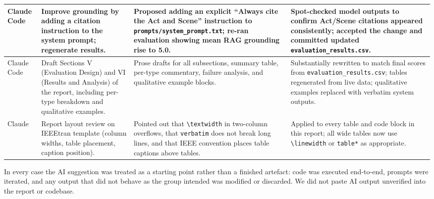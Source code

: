 \documentclass[10pt,conference]{IEEEtran}
\begin{document}
\begin{table}[!htbp]
\begin{tabularx}{\textwidth}{p{1.6cm} p{2.6cm} p{3.0cm} X}
\midrule
Claude Code
& Improve grounding by adding a citation instruction to the system prompt; regenerate results.
& Proposed adding an explicit ``Always cite the Act and Scene'' instruction to \verb|prompts/system_prompt.txt|; re-ran evaluation showing mean RAG grounding rise to 5.0.
& Spot-checked model outputs to confirm Act/Scene citations appeared consistently; accepted the change and committed updated \verb|evaluation_results.csv|. \\
\midrule
Claude Code
& Draft Sections V (Evaluation Design) and VI (Results and Analysis) of the report, including per-type breakdown and qualitative examples.
& Prose drafts for all subsections, summary table, per-type commentary, failure analysis, and qualitative example blocks.
& Substantially rewritten to match final scores from \verb|evaluation_results.csv|; tables regenerated from live data; qualitative examples replaced with verbatim system outputs. \\
\midrule
Claude
& Report layout review on IEEEtran template (column widths, table placement, caption position).
& Pointed out that \texttt{\textbackslash textwidth} in two-column overflows, that \texttt{verbatim} does not break long lines, and that IEEE convention places table captions above tables.
& Applied to every table and code block in this report; all wide tables now use \texttt{\textbackslash linewidth} or \texttt{table*} as appropriate. \\
\bottomrule
\end{tabularx}
\end{table}

In every case the AI suggestion was treated as a starting point rather
than a finished artefact: code was executed end-to-end, prompts were
iterated, and any output that did not behave as the group intended was
modified or discarded. We did not paste AI output unverified into the
report or codebase.
\end{document}
